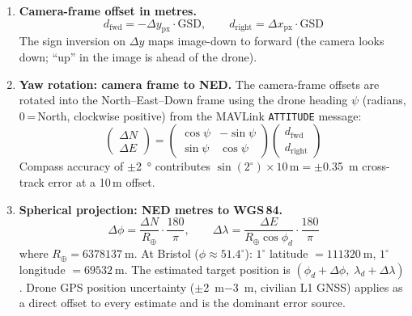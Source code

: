 \documentclass[10pt,a4paper]{article}
\begin{document}
\begin{enumerate}[resume]
  \item \textbf{Camera-frame offset in metres.}
  \begin{equation}
    d_\mathrm{fwd} = -\Delta y_\mathrm{px} \cdot \mathrm{GSD}, \qquad
    d_\mathrm{right} = \Delta x_\mathrm{px} \cdot \mathrm{GSD}
  \end{equation}
  The sign inversion on $\Delta y$ maps image-down to forward (the camera looks down; ``up'' in the image is ahead of the drone).

  \item \textbf{Yaw rotation: camera frame to NED.} The camera-frame offsets are rotated into the North--East--Down frame using the drone heading $\psi$ (radians, 0\,=\,North, clockwise positive) from the MAVLink \texttt{ATTITUDE} message:
  \begin{equation}\label{eq:yaw-rotation}
    \begin{pmatrix} \Delta N \\ \Delta E \end{pmatrix} =
    \begin{pmatrix} \cos\psi & -\sin\psi \\ \sin\psi & \cos\psi \end{pmatrix}
    \begin{pmatrix} d_\mathrm{fwd} \\ d_\mathrm{right} \end{pmatrix}
  \end{equation}
  Compass accuracy of $\pm$\SI{2}{\degree} contributes $\sin(2^{\circ}) \times 10\,\text{m} = \pm$\SI{0.35}{\metre} cross-track error at a 10\,m offset.

  \item \textbf{Spherical projection: NED metres to WGS\,84.}
  \begin{equation}
    \Delta\phi = \frac{\Delta N}{R_\oplus} \cdot \frac{180}{\pi}, \qquad
    \Delta\lambda = \frac{\Delta E}{R_\oplus \cos\phi_d} \cdot \frac{180}{\pi}
  \end{equation}
  where $R_\oplus = \SI{6378137}{\metre}$.  At Bristol ($\phi \approx 51.4^{\circ}$): $1^{\circ}$ latitude $= \SI{111320}{\metre}$, $1^{\circ}$ longitude $= \SI{69532}{\metre}$.  The estimated target position is $(\phi_d + \Delta\phi,\; \lambda_d + \Delta\lambda)$.  Drone GPS position uncertainty ($\pm$\SI{2}{\metre}$-$\SI{3}{\metre}, civilian L1 GNSS) applies as a direct offset to every estimate and is the dominant error source.
\end{enumerate}
\end{document}

